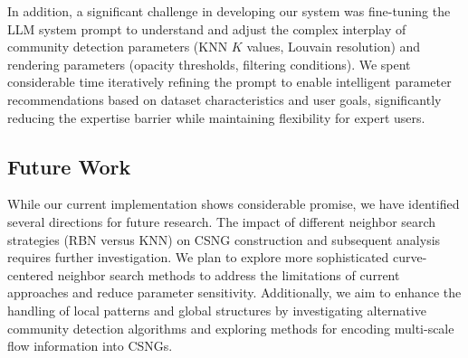 In addition, a significant challenge in developing our system was fine-tuning the LLM system prompt to understand and adjust the complex interplay of community detection parameters (KNN $K$ values, Louvain resolution) and rendering parameters (opacity thresholds, filtering conditions). We spent considerable time iteratively refining the prompt to enable intelligent parameter recommendations based on dataset characteristics and user goals, significantly reducing the expertise barrier while maintaining flexibility for expert users.


\subsection{Future Work}

While our current implementation shows considerable promise, we have identified several directions for future research. The impact of different neighbor search strategies (RBN versus KNN) on CSNG construction and subsequent analysis requires further investigation. We plan to explore more sophisticated curve-centered neighbor search methods to address the limitations of current approaches and reduce parameter sensitivity. Additionally, we aim to enhance the handling of local patterns and global structures by investigating alternative community detection algorithms and exploring methods for encoding multi-scale flow information into CSNGs.

